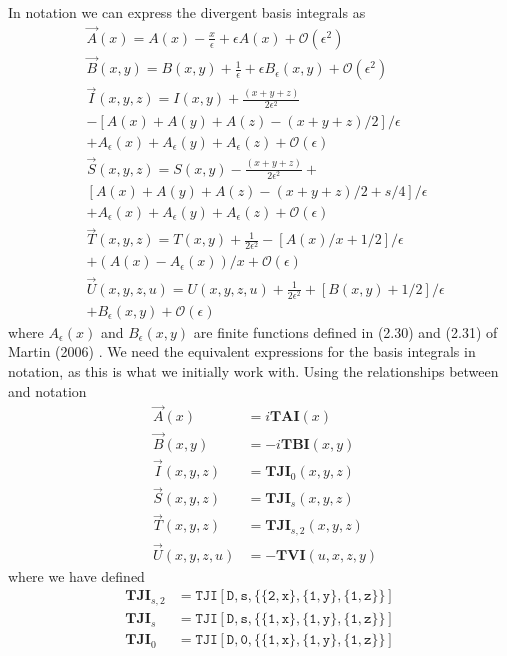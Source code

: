 In \tsil notation we can express the divergent basis integrals as \cite{Martin2006}
\begin{align*}
&\vec{A}(x) = A(x) -\frac{x}{\epsilon} +\epsilon A(x) +\mathcal{O}(\epsilon^2) \\
&\vec{B}(x,y)= B(x,y) +\frac{1}{\epsilon} +\epsilon B_{\epsilon}(x,y) +\mathcal{O}(\epsilon^2) \\
&\vec{I}(x,y,z)= I(x,y) +\frac{(x+y+z)}{2\epsilon^2}  \\ &- \left[A(x)+A(y)+A(z)-(x+y+z)/2\right]/\epsilon\\ &+ A_{\epsilon}(x)+ A_{\epsilon}(y)+ A_{\epsilon}(z)+\mathcal{O}(\epsilon) \\
&\vec{S}(x,y,z)= S(x,y) -\frac{(x+y+z)}{2\epsilon^2} + \\ & \left[A(x)+A(y)+A(z)-(x+y+z)/2+s/4\right]/\epsilon\\ &+ A_{\epsilon}(x)+ A_{\epsilon}(y)+ A_{\epsilon}(z)+\mathcal{O}(\epsilon) \\
&\vec{T}(x,y,z)= T(x,y) +\frac{1}{2\epsilon^2} -\left[A(x)/x +1/2\right]/\epsilon\\ &+ (A(x)- A_{\epsilon}(x))/x+\mathcal{O}(\epsilon) \\
&\vec{U}(x,y,z,u)= U(x,y,z,u) +\frac{1}{2\epsilon^2} +\left[B(x,y) +1/2\right]/\epsilon\\ &+ B_{\epsilon}(x,y)+\mathcal{O}(\epsilon)
\end{align*}
where $A_{\epsilon}(x)$ and $B_{\epsilon}(x,y)$ are finite functions defined in (2.30) and (2.31) of Martin (2006) \cite{Martin2006}.  We need the equivalent expressions for the basis integrals in \tarcer notation, as this is what we initially work with.  Using the relationships between \tsil and \tarcer notation \cite{Martin2006}
\begin{eqnarray*}
&\vec{A}(x) &=i \mathtt{\mathbf{TAI}}(x)\\
&\vec{B}(x,y) &=-i \mathtt{\mathbf{TBI}}(x,y)\\
&\vec{I}(x,y,z)&=\mathtt{\mathbf{TJI}}_0(x,y,z)\\
&\vec{S}(x,y,z)&=\mathtt{\mathbf{TJI}}_s(x,y,z)\\
&\vec{T}(x,y,z)&=\mathtt{\mathbf{TJI}}_{s,2}(x,y,z)\\
&\vec{U}(x,y,z,u)&=-\mathtt{\mathbf{TVI}}(u,x,z,y)
\end{eqnarray*}
where we have defined
\begin{align*}
\mathtt{\mathbf{TJI}}_{s,2}&= \mathtt{TJI[D,s,\{\{2,x\}, \{1,y\}, \{1,z\}\}]}\\
\mathtt{\mathbf{TJI}}_{s}&= \mathtt{TJI[D,s,\{\{1,x\}, \{1,y\}, \{1,z\}\}]}\\
\mathtt{\mathbf{TJI}}_{0}&= \mathtt{TJI[D,0,\{\{1,x\}, \{1,y\}, \{1,z\}\}]}
\end{align*}
